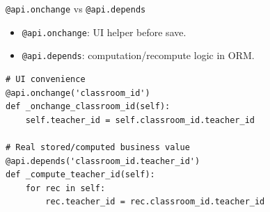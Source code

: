 \begin{frame}[fragile]{\texttt{@api.onchange} vs \texttt{@api.depends}}
	\begin{itemize}
		\item \texttt{@api.onchange}: UI helper before save.
		\item \texttt{@api.depends}: computation/recompute logic in ORM.
	\end{itemize}
\begin{lstlisting}
# UI convenience
@api.onchange('classroom_id')
def _onchange_classroom_id(self):
	self.teacher_id = self.classroom_id.teacher_id

# Real stored/computed business value
@api.depends('classroom_id.teacher_id')
def _compute_teacher_id(self):
	for rec in self:
		rec.teacher_id = rec.classroom_id.teacher_id
\end{lstlisting}
\end{frame}
